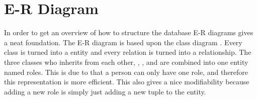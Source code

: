 \newcommand{\erdiagram}[1][]{E-R diagram}
\section{E-R Diagram}
In order to get an overview of how to structure the database \erdiagram[]s gives a neat foundation. 
The \erdiagram[] is based upon the class diagram . 
Every class is turned into a entity and every relation is turned into a relationship. 
The three classes who inherits from each other, \client[], \staff[], and \admin[] are combined into one entity named roles. This is due to that a person can only have one role, and therefore this representation is more efficient. This also gives a nice modifiability because adding a new role is simply just adding a new tuple to the entity. 